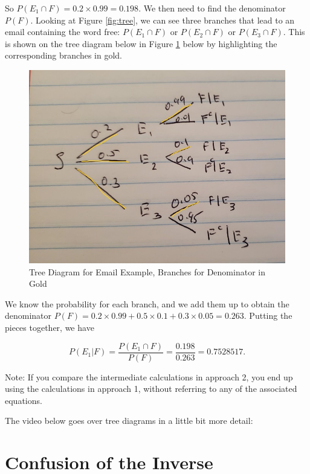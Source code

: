 \documentclass[
]{book}
\begin{document}
So \(P(E_1 \cap F) = 0.2 \times 0.99 = 0.198\). We then need to find the denominator \(P(F)\). Looking at Figure \ref{fig:tree}, we can see three branches that lead to an email containing the word free: \(P(E_1 \cap F)\) or \(P(E_2 \cap F)\) or \(P(E_3 \cap F)\). This is shown on the tree diagram below in Figure \ref{fig:tree2} below by highlighting the corresponding branches in gold.

\begin{figure}
\centering
\includegraphics{images/02-treepath2.jpg}
\caption{\label{fig:tree2}Tree Diagram for Email Example, Branches for Denominator in Gold}
\end{figure}

We know the probability for each branch, and we add them up to obtain the denominator \(P(F) = 0.2 \times 0.99 + 0.5 \times 0.1 + 0.3 \times 0.05 = 0.263.\) Putting the pieces together, we have

\[
P(E_1|F) = \frac{P(E_1 \cap F)}{P(F)} = \frac{0.198}{0.263} = 0.7528517.
\]

Note: If you compare the intermediate calculations in approach 2, you end up using the calculations in approach 1, without referring to any of the associated equations.

The video below goes over tree diagrams in a little bit more detail:

\section{Confusion of the Inverse}\label{confusion-of-the-inverse}
\end{document}
